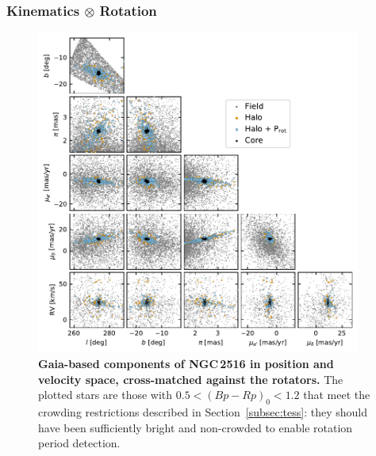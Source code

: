 \documentclass[12pt,twocolumn,tighten]{aastex63}
\begin{document}
\subsubsection{Kinematics $\otimes$ Rotation}

\begin{figure}[t]
	\begin{center}
		\leavevmode
		\includegraphics[width=0.95\textwidth]{f4.pdf}
	\end{center}
	\vspace{-0.7cm}
	\caption{ {\bf Gaia-based components of NGC\,2516 in position and
    velocity space, cross-matched against the rotators.}
    The plotted stars are those with $0.5<(Bp-Rp)_0<1.2$ that meet the
    crowding restrictions described in Section~\ref{subsec:tess}: they
    should have been sufficiently bright and non-crowded to enable
    rotation period detection.
		\label{fig:gaia6d_x_rotn}
	}
\end{figure}
\end{document}
